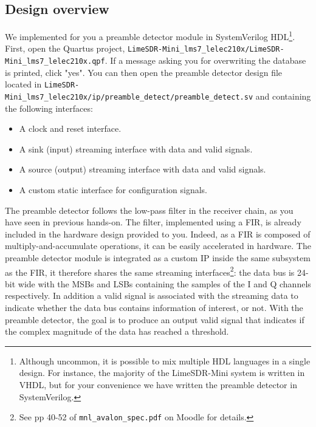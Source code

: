 \subsection{Design overview}
We implemented for you a preamble detector module in SystemVerilog HDL\footnote{Although uncommon, it is possible to mix multiple HDL languages in a single design. For instance, the majority of the LimeSDR-Mini system is written in VHDL, but for your convenience we have written the preamble detector in SystemVerilog.}. First, open the Quartus project, \texttt{LimeSDR-Mini\_lms7\_lelec210x/LimeSDR-Mini\_lms7\_lelec210x.qpf}. If a message asking you for overwriting the database is printed, click "yes". You can then open the preamble detector design file located in \texttt{LimeSDR-Mini\_lms7\_lelec210x/ip/preamble\_detect/preamble\_detect.sv} and containing the following interfaces:
\begin{itemize}
    \item A clock and reset interface.
    \item A sink (input) streaming interface with data and valid signals.
    \item A source (output) streaming interface with data and valid signals.
    \item A custom static interface for configuration signals.
\end{itemize}
The preamble detector follows the low-pass filter in the receiver chain, as you have seen in previous hands-on. The filter, implemented using a FIR, is already included in the hardware design provided to you. Indeed, as a FIR is composed of multiply-and-accumulate operations, it can be easily accelerated in hardware. The preamble detector module is integrated as a custom IP inside the same subsystem as the FIR, it therefore shares the same streaming interfaces\footnote{See pp 40-52 of \texttt{mnl\_avalon\_spec.pdf} on Moodle for details.}: the data bus is 24-bit wide with the MSBs and LSBs containing the samples of the I and Q channels respectively. In addition a valid signal is associated with the streaming data to indicate whether the data bus contains information of interest, or not. With the preamble detector, the goal is to produce an output valid signal that indicates if the complex magnitude of the data has reached a threshold.


